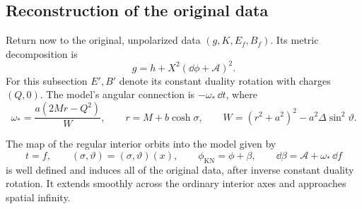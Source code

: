 \subsection{Reconstruction of the original data}

Return now to the original, unpolarized data
\((g,K,E_f,B_f)\). Its metric decomposition is
\[
 g=h+X^2(\dd\phi+\mathcal A)^2.
\]
For this subsection \(E',B'\) denote its constant duality rotation
with charges \((Q,0)\). The model's angular connection is
\(-\omega_*\,\dd t\), where
\[
 \omega_*=\frac{a(2Mr-Q^2)}{W},\qquad
 r=M+b\cosh\sigma,\qquad
 W=(r^2+a^2)^2-a^2\Delta\sin^2\vartheta .
\]

\begin{proposition}\label{k:lift}
The map of the regular interior orbits into the model given by
\begin{equation}\label{k:embedding}
 t=f,\qquad
 (\sigma,\vartheta)=(\sigma,\vartheta)(x),\qquad
 \phi_{\mathrm{KN}}=\phi+\beta,\qquad
 \dd\beta=\mathcal A+\omega_*\,\dd f
\end{equation}
is well defined and induces all of the original data, after inverse
constant duality rotation. It extends smoothly across the ordinary
interior axes and approaches spatial infinity.
\end{proposition}


